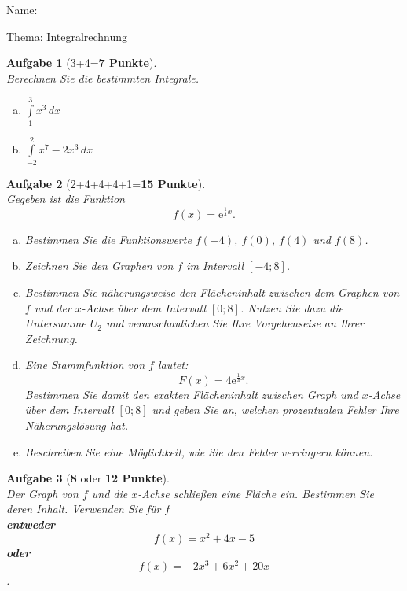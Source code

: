 \documentclass[fleqn,leqno,11pt]{scrartcl}
\theoremstyle{aufgabenstyle}
\newtheorem{aufgabe}{Aufgabe}
\begin{document}
\begin{flushleft}
Name: \\[2em]
\begin{center}
{\Large Thema: Integralrechnung}
\end{center}
\vspace{2em}


\begin{aufgabe}[3+4={\bf 7 Punkte}] ~ \\
Berechnen Sie die bestimmten Integrale.
\begin{multicols}{2}
\begin{enumerate}[a)]
\item $\int\limits_{1}^{3} x^{3}\, dx$
\item $\int\limits_{-2}^{2} x^{7}-2x^{3}\, dx$
\end{enumerate}
\end{multicols}
\end{aufgabe}


\begin{aufgabe}[2+4+4+4+1={\bf 15 Punkte}] ~ \\
Gegeben ist die Funktion
\[ f(x)=\mathrm{e}^{\frac{1}{4}x}. \]
\begin{enumerate}[a)]
\item Bestimmen Sie die Funktionswerte $f(-4)$, $f(0)$, $f(4)$ und $f(8)$.
\item Zeichnen Sie den Graphen von $f$ im Intervall $[-4;8]$. 
\item Bestimmen Sie n\"aherungsweise den Fl\"acheninhalt zwischen dem Graphen von $f$ und der $x$-Achse \"uber dem Intervall $[0;8]$. Nutzen Sie dazu die Untersumme $U_2$ und veranschaulichen Sie Ihre Vorgehenseise an Ihrer Zeichnung.
\item Eine Stammfunktion von $f$ lautet:
\[ F(x)=4\mathrm{e}^{\frac{1}{4}x}. \]
Bestimmen Sie damit den exakten Fl\"acheninhalt zwischen Graph und $x$-Achse \"uber dem Intervall $[0;8]$ und geben Sie an, welchen prozentualen Fehler Ihre N\"aherungsl\"osung hat.
\item Beschreiben Sie eine M\"oglichkeit, wie Sie den Fehler verringern k\"onnen.
\end{enumerate}
\end{aufgabe}


\begin{aufgabe}[{\bf 8} oder {\bf 12 Punkte}] ~ \\
Der Graph von $f$ und die $x$-Achse schlie\ss{}en eine Fl\"ache ein. Bestimmen Sie deren Inhalt. Verwenden Sie f\"ur $f$ \\ 
{\bf entweder}
\[ f(x)=x^2+4x-5 \]
{\bf oder}
\[ f(x)=-2x^3+6x^2+20x \].
\end{aufgabe}


\end{flushleft}
\end{document}
